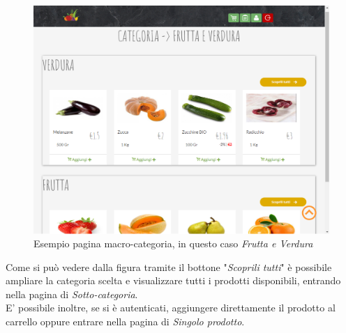 	\begin{figure}[H]
		\includegraphics[width=\linewidth]{res/img/Macro-cat}
		\caption{Esempio pagina macro-categoria, in questo caso \textit{Frutta e Verdura}}
		\label{Pagina Macro-categoria}
	\end{figure}
	Come si può vedere dalla figura tramite il bottone "\textit{Scoprili tutti}" è possibile ampliare la categoria scelta e visualizzare tutti i prodotti disponibili, entrando nella pagina di \textit{Sotto-categoria}.\\
	E' possibile inoltre, se si è autenticati, aggiungere direttamente il prodotto al carrello oppure entrare nella pagina di \textit{Singolo prodotto}.
	
